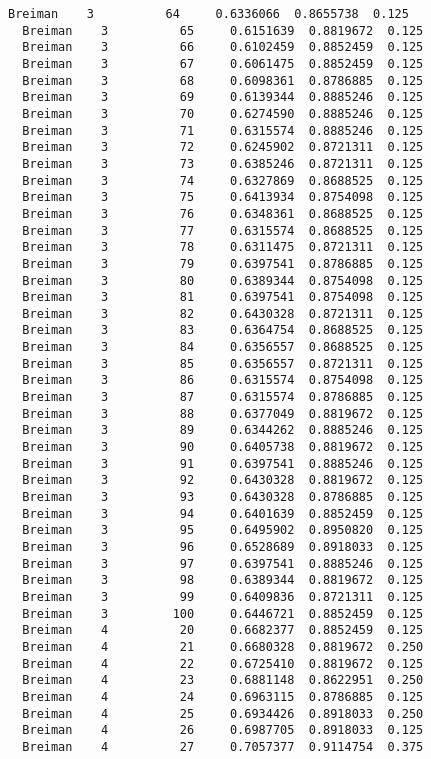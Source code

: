 \documentclass[11pt]{article}
\begin{document}
\begin{Verbatim}[commandchars=\\\{\}]
  Breiman    3          64     0.6336066  0.8655738  0.125
  Breiman    3          65     0.6151639  0.8819672  0.125
  Breiman    3          66     0.6102459  0.8852459  0.125
  Breiman    3          67     0.6061475  0.8852459  0.125
  Breiman    3          68     0.6098361  0.8786885  0.125
  Breiman    3          69     0.6139344  0.8885246  0.125
  Breiman    3          70     0.6274590  0.8885246  0.125
  Breiman    3          71     0.6315574  0.8885246  0.125
  Breiman    3          72     0.6245902  0.8721311  0.125
  Breiman    3          73     0.6385246  0.8721311  0.125
  Breiman    3          74     0.6327869  0.8688525  0.125
  Breiman    3          75     0.6413934  0.8754098  0.125
  Breiman    3          76     0.6348361  0.8688525  0.125
  Breiman    3          77     0.6315574  0.8688525  0.125
  Breiman    3          78     0.6311475  0.8721311  0.125
  Breiman    3          79     0.6397541  0.8786885  0.125
  Breiman    3          80     0.6389344  0.8754098  0.125
  Breiman    3          81     0.6397541  0.8754098  0.125
  Breiman    3          82     0.6430328  0.8721311  0.125
  Breiman    3          83     0.6364754  0.8688525  0.125
  Breiman    3          84     0.6356557  0.8688525  0.125
  Breiman    3          85     0.6356557  0.8721311  0.125
  Breiman    3          86     0.6315574  0.8754098  0.125
  Breiman    3          87     0.6315574  0.8786885  0.125
  Breiman    3          88     0.6377049  0.8819672  0.125
  Breiman    3          89     0.6344262  0.8885246  0.125
  Breiman    3          90     0.6405738  0.8819672  0.125
  Breiman    3          91     0.6397541  0.8885246  0.125
  Breiman    3          92     0.6430328  0.8819672  0.125
  Breiman    3          93     0.6430328  0.8786885  0.125
  Breiman    3          94     0.6401639  0.8852459  0.125
  Breiman    3          95     0.6495902  0.8950820  0.125
  Breiman    3          96     0.6528689  0.8918033  0.125
  Breiman    3          97     0.6397541  0.8885246  0.125
  Breiman    3          98     0.6389344  0.8819672  0.125
  Breiman    3          99     0.6409836  0.8721311  0.125
  Breiman    3         100     0.6446721  0.8852459  0.125
  Breiman    4          20     0.6682377  0.8852459  0.125
  Breiman    4          21     0.6680328  0.8819672  0.250
  Breiman    4          22     0.6725410  0.8819672  0.125
  Breiman    4          23     0.6881148  0.8622951  0.250
  Breiman    4          24     0.6963115  0.8786885  0.125
  Breiman    4          25     0.6934426  0.8918033  0.250
  Breiman    4          26     0.6987705  0.8918033  0.125
  Breiman    4          27     0.7057377  0.9114754  0.375

\end{Verbatim}
\end{document}
